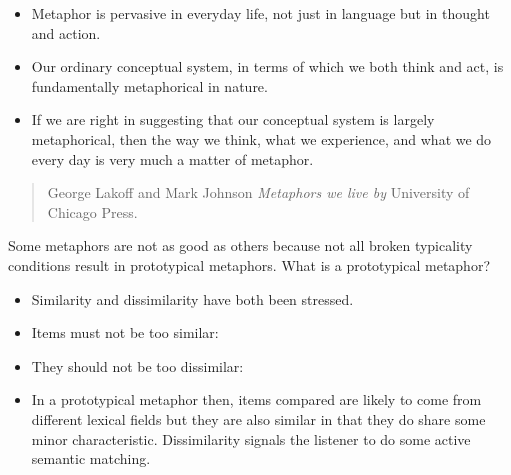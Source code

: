 \documentclass[a4paper,landscape,headrule,footrule,xetex]{foils}
\begin{document}

\begin{itemize}
\item Metaphor is pervasive in everyday life, not just in
language but in thought and action.
\item Our ordinary conceptual system, in terms of which we
both think and act, is fundamentally metaphorical in
nature.
\item If we are right in suggesting that our conceptual system
is largely metaphorical, then the way we think, what we
experience, and what we do every day is very much a
matter of metaphor.
\end{itemize}

\begin{quote}
  George Lakoff and Mark Johnson \citeyear{Lakoff:Johnson:1980} \textit{Metaphors we live by} 
  University of Chicago Press.
\end{quote}




Some metaphors are not as good as others because not all broken typicality
conditions result in prototypical metaphors. What is a prototypical
metaphor?

\begin{itemize}
\item Similarity and dissimilarity have both been stressed.
\item Items must not be too similar:
  \begin{exe}
    \ex {}
    \ex {}
    \ex {}
  \end{exe}
\newpage
\item They should not be too dissimilar:
  \begin{exe}
    \ex {}
    \ex {}
    \ex {}
  \end{exe}
\item In a prototypical metaphor then, items compared are
likely to come from different lexical fields but they are
also similar in that they do share some minor
characteristic. Dissimilarity signals the listener to do
some active semantic matching.
\begin{exe}
  \ex {}
  \ex {}
  \ex {}
\end{exe}
\end{itemize}
\end{document}
